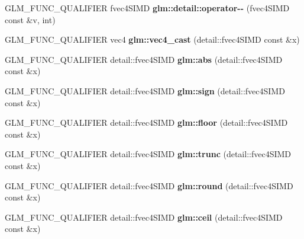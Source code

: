 \begin{DoxyCompactItemize}
\item 
\mbox{\label{simd__vec4_8inl_aa03040a975ab9847d84e843caa13ec86}} 
G\+L\+M\+\_\+\+F\+U\+N\+C\+\_\+\+Q\+U\+A\+L\+I\+F\+I\+ER fvec4\+S\+I\+MD {\bfseries glm\+::detail\+::operator-\/-\/} (fvec4\+S\+I\+MD const \&v, int)
\item 
\mbox{\label{simd__vec4_8inl_a8fd3f484b1badc1724ab65dc9714ad6c}} 
G\+L\+M\+\_\+\+F\+U\+N\+C\+\_\+\+Q\+U\+A\+L\+I\+F\+I\+ER vec4 {\bfseries glm\+::vec4\+\_\+cast} (detail\+::fvec4\+S\+I\+MD const \&x)
\item 
\mbox{\label{simd__vec4_8inl_a68109cc8f5b3e44fd65707fac87fb4d5}} 
G\+L\+M\+\_\+\+F\+U\+N\+C\+\_\+\+Q\+U\+A\+L\+I\+F\+I\+ER detail\+::fvec4\+S\+I\+MD {\bfseries glm\+::abs} (detail\+::fvec4\+S\+I\+MD const \&x)
\item 
\mbox{\label{simd__vec4_8inl_af67d3ef2ca567fe890c09a8fa26328bf}} 
G\+L\+M\+\_\+\+F\+U\+N\+C\+\_\+\+Q\+U\+A\+L\+I\+F\+I\+ER detail\+::fvec4\+S\+I\+MD {\bfseries glm\+::sign} (detail\+::fvec4\+S\+I\+MD const \&x)
\item 
\mbox{\label{simd__vec4_8inl_a96b854694bd3ae049376cbdba57f2599}} 
G\+L\+M\+\_\+\+F\+U\+N\+C\+\_\+\+Q\+U\+A\+L\+I\+F\+I\+ER detail\+::fvec4\+S\+I\+MD {\bfseries glm\+::floor} (detail\+::fvec4\+S\+I\+MD const \&x)
\item 
\mbox{\label{simd__vec4_8inl_a9209720f29f7ce2e879af12191051927}} 
G\+L\+M\+\_\+\+F\+U\+N\+C\+\_\+\+Q\+U\+A\+L\+I\+F\+I\+ER detail\+::fvec4\+S\+I\+MD {\bfseries glm\+::trunc} (detail\+::fvec4\+S\+I\+MD const \&x)
\item 
\mbox{\label{simd__vec4_8inl_ac38130a4224e740980925150ea8dae5e}} 
G\+L\+M\+\_\+\+F\+U\+N\+C\+\_\+\+Q\+U\+A\+L\+I\+F\+I\+ER detail\+::fvec4\+S\+I\+MD {\bfseries glm\+::round} (detail\+::fvec4\+S\+I\+MD const \&x)
\item 
\mbox{\label{simd__vec4_8inl_adc50f5413973998fb007fda7a6149ef5}} 
G\+L\+M\+\_\+\+F\+U\+N\+C\+\_\+\+Q\+U\+A\+L\+I\+F\+I\+ER detail\+::fvec4\+S\+I\+MD {\bfseries glm\+::ceil} (detail\+::fvec4\+S\+I\+MD const \&x)
\item 

\end{DoxyCompactItemize}
